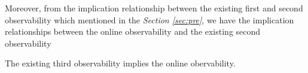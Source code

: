  Moreover, from the implication relationship between the existing first and second observability which mentioned in the {\em Section \ref{sec:pre}}, we have the implication relationships between the online observability and the existing second observability
\begin{theorem}
The existing third observability implies the online obervability.
\end{theorem}
